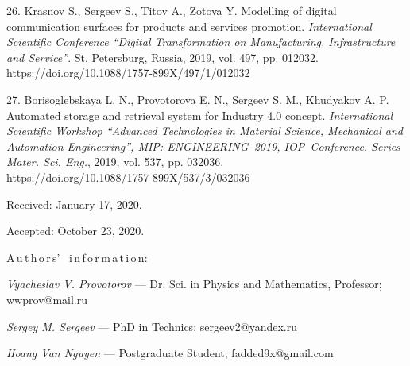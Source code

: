 {26. Krasnov S., Sergeev S., Titov A., Zotova Y.  Modelling of
digital communication surfaces for products and services
promotion. \emph{International Scientific Conference ``Digital
Transformation on Manufacturing, Infrastructure and Service''}.
St. Petersburg, Russia, 2019,  vol. 497, pp. 012032.\\
https://doi.org/10.1088/1757-899X/497/1/012032

27. Borisoglebskaya L. N., Provotorova E. N., Sergeev S. M.,
Khudyakov A. P.  Automated sto\-rage and retrieval system for
Industry 4.0 concept. \emph{International Scientific Workshop
``Advanced Tech\-no\-lo\-gies in Material Science, Mechanical and
Automation Engineering'', MIP: ENGINEERING--2019, IOP~Conference.
Series Mater. Sci. Eng.}, 2019, vol. 537, pp. 032036.\\
https://doi.org/10.1088/1757-899X/537/3/032036

\vskip 1.5mm

%


Received:  January 17, 2020.

Accepted: October 23, 2020.

\vskip 4.5mm%
A\,u\,t\,h\,o\,r\,s' \ i\,n\,f\,o\,r\,m\,a\,t\,i\,o\,n:

\vskip 2mm \textit{Vyacheslav V. Provotorov} --- Dr. Sci. in
Physics and Mathematics, Professor;
 wwprov@mail.ru

\vskip 2mm \textit{Sergey M. Sergeev} ---  PhD in Technics;
sergeev2@yandex.ru

\vskip 2mm \textit{Hoang Van Nguyen} --- Postgraduate Student;
fadded9x@gmail.com


}
